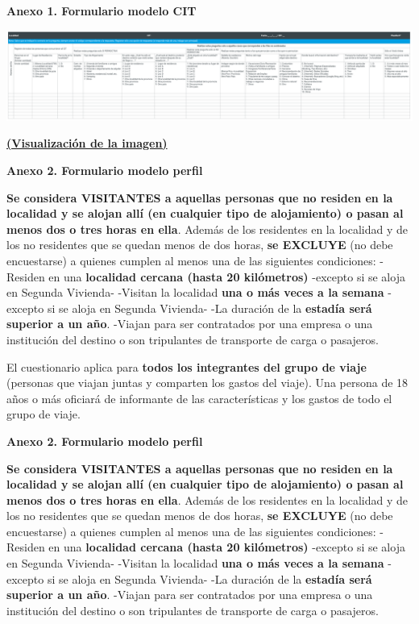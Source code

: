 \documentclass[
]{book}
\begin{document}
\textbf{Anexo 1. Formulario modelo CIT}

\begin{center}\includegraphics[width=1\linewidth]{imagenes/graf13} \end{center}

\textbf{\href{https://raw.githubusercontent.com/dnme-minturdep/DT4_perfiles/master/imagenes/graf13.png}{(Visualización de la imagen)}}

\textbf{Anexo 2. Formulario modelo perfil}

\textbf{Se considera VISITANTES a aquellas personas que no residen en la localidad y se alojan allí (en cualquier tipo de alojamiento) o pasan al menos dos o tres horas en ella}. Además de los residentes en la localidad y de los no residentes que se quedan menos de dos horas, \textbf{se EXCLUYE} (no debe encuestarse) a quienes cumplen al menos una de las siguientes condiciones:
-Residen en una \textbf{localidad cercana (hasta 20 kilómetros)} -excepto si se aloja en Segunda Vivienda-
-Visitan la localidad \textbf{una o más veces a la semana} -excepto si se aloja en Segunda Vivienda-
-La duración de la \textbf{estadía será superior a un año}.
-Viajan para ser contratados por una empresa o una institución del destino o son tripulantes de transporte de carga o pasajeros.

El cuestionario aplica para \textbf{todos los integrantes del grupo de viaje} (personas que viajan juntas y comparten los gastos del viaje).
Una persona de 18 años o más oficiará de informante de las características y los gastos de todo el grupo de viaje.

\textbf{Anexo 2. Formulario modelo perfil}

\textbf{Se considera VISITANTES a aquellas personas que no residen en la localidad y se alojan allí (en cualquier tipo de alojamiento) o pasan al menos dos o tres horas en ella}. Además de los residentes en la localidad y de los no residentes que se quedan menos de dos horas, \textbf{se EXCLUYE} (no debe encuestarse) a quienes cumplen al menos una de las siguientes condiciones:
-Residen en una \textbf{localidad cercana (hasta 20 kilómetros)} -excepto si se aloja en Segunda Vivienda-
-Visitan la localidad \textbf{una o más veces a la semana} -excepto si se aloja en Segunda Vivienda-
-La duración de la \textbf{estadía será superior a un año}.
-Viajan para ser contratados por una empresa o una institución del destino o son tripulantes de transporte de carga o pasajeros.
\end{document}

